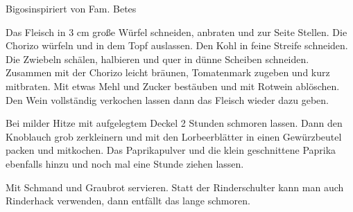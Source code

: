 \begin{recipe}{Bigos}{inspiriert von Fam. Betes}\label{Bigos}
  \inglist

\steps

Das Fleisch in 3 cm große Würfel schneiden, anbraten und zur Seite Stellen. Die
Chorizo würfeln und in dem Topf auslassen. Den Kohl in feine Streife schneiden.
Die Zwiebeln schälen, halbieren und quer in dünne Scheiben schneiden. Zusammen
mit der Chorizo leicht bräunen, Tomatenmark zugeben und kurz mitbraten. Mit
etwas Mehl und Zucker bestäuben und mit Rotwein ablöschen.  Den Wein
vollständig verkochen lassen dann das Fleisch wieder dazu geben.

Bei milder Hitze mit aufgelegtem Deckel 2 Stunden schmoren lassen. Dann den
Knoblauch grob zerkleinern und mit den Lorbeerblätter in einen Gewürzbeutel
packen und mitkochen. Das Paprikapulver und die klein geschnittene Paprika
ebenfalls hinzu und noch mal eine Stunde ziehen lassen.

Mit Schmand und Graubrot servieren. Statt der Rinderschulter kann man auch
Rinderhack verwenden, dann entfällt das lange schmoren.

\end{recipe}
